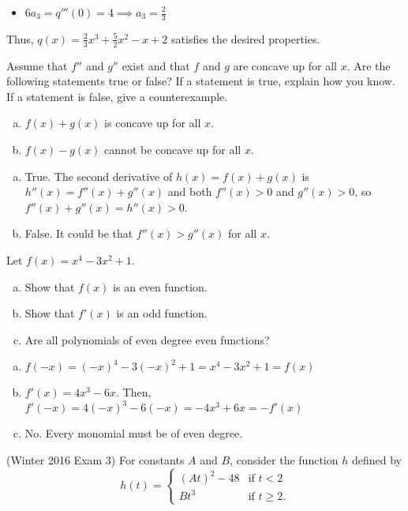 \documentclass[11pt]{exam}
\begin{document}
\begin{questions}
\begin{solution}
\begin{itemize}
  \item \(6 a_3 = q'''(0) = 4 \implies a_3 = \frac{2}{3}\)
  \end{itemize}
  Thus, \(q(x) = \frac{2}{3}x^3+\frac{5}{2}x^2-x+2\) satisfies the
  desired properties.
\end{solution}
\question Assume that $f''$ and $g''$ exist and that $f$ and $g$ are concave up for all $x$. Are the following statements true or false? If a statement is true, explain how you know. If a statement is false, give a counterexample.
\begin{enumerate}[(a)]
	\item $f(x)+g(x)$ is concave up for all $x$.
	\item $f(x)-g(x)$ cannot be concave up for all $x$.
\end{enumerate}
\begin{solution}
  \begin{enumerate}[(a)]
  \item True. The second derivative of \(h(x) = f(x)+g(x)\) is
    \(h''(x) = f''(x)+g''(x)\) and both \(f''(x) > 0\) and \(g''(x) >
    0\), so \(f''(x)+g''(x) = h''(x) > 0\).
  \item False. It could be that \(f''(x) > g''(x)\) for all \(x\).
  \end{enumerate}
\end{solution}
\question Let $f(x) = x^4 - 3x^2 + 1$.
\begin{enumerate}[(a)]
	\item Show that $f(x)$ is an even function.
	\item Show that $f'(x)$ is an odd function.
	\item Are all polynomials of even degree even functions?
\end{enumerate}
\begin{solution}
  \begin{enumerate}[(a)]
  \item \(f(-x) = (-x)^4-3(-x)^2+1 = x^4-3x^2+1 = f(x)\) 
  \item \(f'(x) = 4 x^3 - 6 x\). Then, \(f'(-x) = 4(-x)^3-6(-x) =
    -4x^3+6x = -f'(x)\)
  \item No. Every monomial must be of even degree.
  \end{enumerate}
\end{solution}
\question (Winter 2016 Exam 3) For constants $A$ and $B$, consider the function $h$ defined by
\[
h(t) = \begin{cases}
(At)^2-48	& \text{if } t < 2\\
Bt^3		& \text{if } t \geqslant 2.	

\end{cases}\]
\end{questions}
\end{document}

